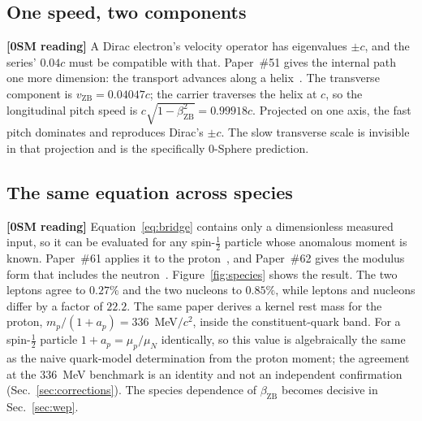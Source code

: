 \documentclass[%
 reprint, amsmath,amssymb, aps, prb, ]{revtex4-2}
\numberwithin{equation}{section}
\newcommand{\vZB}{v_{\text{ZB}}}
\newcommand{\betaZB}{\beta_{\text{ZB}}}
\begin{document}
\subsection{One speed, two components}

\textbf{[0SM reading]} A Dirac electron's velocity operator has eigenvalues $\pm c$, and the series' $0.04c$ must be compatible with that. Paper~\#51 gives the internal path one more dimension: the transport advances along a helix~\cite{hanamura51}. The transverse component is $\vZB = 0.04047c$; the carrier traverses the helix at $c$, so the longitudinal pitch speed is $c\sqrt{1-\betaZB^{2}} = 0.99918c$. Projected on one axis, the fast pitch dominates and reproduces Dirac's $\pm c$. The slow transverse scale is invisible in that projection and is the specifically 0-Sphere prediction.

\subsection{The same equation across species}

\textbf{[0SM reading]} Equation~\eqref{eq:bridge} contains only a dimensionless measured input, so it can be evaluated for any spin-$\tfrac12$ particle whose anomalous moment is known. Paper~\#61 applies it to the proton~\cite{hanamura61}, and Paper~\#62 gives the modulus form that includes the neutron~\cite{hanamura62}. Figure~\ref{fig:species} shows the result. The two leptons agree to $0.27\%$ and the two nucleons to $0.85\%$, while leptons and nucleons differ by a factor of $22.2$. The same paper derives a kernel rest mass for the proton, $m_p/(1+a_p) = 336$~MeV$/c^{2}$, inside the constituent-quark band. For a spin-$\tfrac12$ particle $1 + a_p = \mu_p/\mu_N$ identically, so this value is algebraically the same as the naive quark-model determination from the proton moment; the agreement at the $336$~MeV benchmark is an identity and not an independent confirmation (Sec.~\ref{sec:corrections}). The species dependence of $\betaZB$ becomes decisive in Sec.~\ref{sec:wep}.
\end{document}
